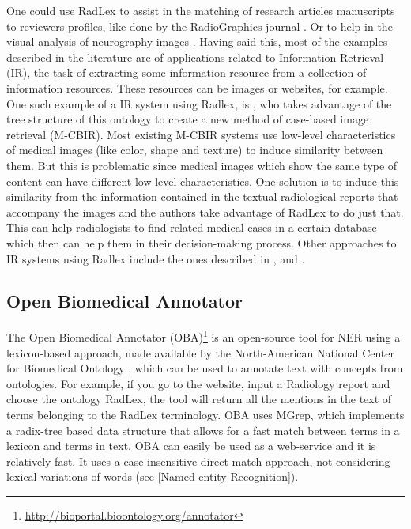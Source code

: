 One could use RadLex to assist in the matching of research articles manuscripts to reviewers profiles, like done by the RadioGraphics journal \citep{Klein2013}. Or to help in the visual analysis of neurography images \citep{Wang2015}. Having said this, most of the examples described in the literature are of applications related to Information Retrieval (IR), the task of extracting some information resource from a collection of information resources. These resources can be images or websites, for example. One such example of a IR system using Radlex, is \citep{Spanier2016}, who takes advantage of the tree structure of this ontology to create a new method of case-based image retrieval (M-CBIR). Most existing M-CBIR systems use low-level characteristics of medical images (like color, shape and texture) to induce similarity between them. But this is problematic since medical images which show the same type of content can have different low-level characteristics. One solution is to induce this similarity from the information contained in the textual radiological reports that accompany the images and the authors take advantage of RadLex to do just that. This can help radiologists to find related medical cases in a certain database which then can help them in their decision-making process. Other approaches to IR systems using Radlex include the ones described in \citep{Do2010}, \citep{Kurtz2014} and \citep{Gerstmair2012}.


\subsection{Open Biomedical Annotator}

The Open Biomedical Annotator (OBA)\footnote{\url{http://bioportal.bioontology.org/annotator}} is an open-source tool for NER using a lexicon-based approach, made available by the North-American National Center for Biomedical Ontology \citep{Jonquet2009}, which can be used to annotate text with concepts from ontologies. For example, if you go to the website, input a Radiology report and choose the ontology RadLex, the tool will return all the mentions in the text of terms belonging to the RadLex terminology. OBA uses MGrep, which implements a radix-tree based data structure that allows for a fast match between terms in a lexicon and terms in text. OBA can easily be used as a web-service and it is relatively fast. It uses a case-insensitive direct match approach, not considering lexical variations of words (see \ref{Named-entity Recognition}).

